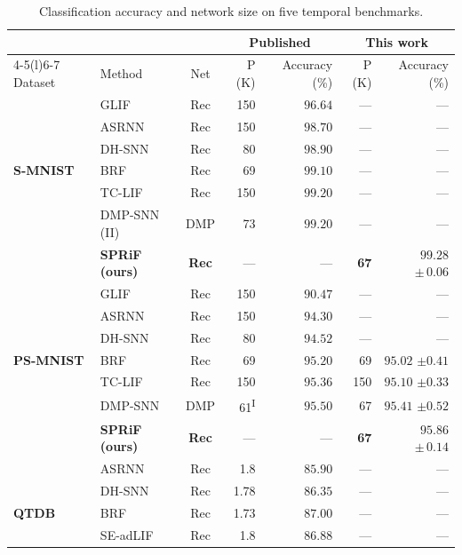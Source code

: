\documentclass[letterpaper,journal]{IEEEtran}
\begin{document}
\begin{table}[!t]
\caption{Classification accuracy and network size on five temporal benchmarks.}
\label{tab:main_results}
\centering\footnotesize
\setlength{\tabcolsep}{3pt}
\renewcommand{\arraystretch}{0.88}
\begin{tabular*}{\textwidth}{@{\extracolsep{\fill}}llcrrrr@{}}
\toprule
& & & \multicolumn{2}{c}{Published} & \multicolumn{2}{c}{This work}\\
\cmidrule(lr){4-5}\cmidrule(l){6-7}
Dataset & Method & Net & P (K) & Accuracy (\%) & P (K) & Accuracy (\%)\\
\midrule
 & GLIF~\cite{glif} & Rec & 150 & $96.64$ & --- & ---\\
 & ASRNN~\cite{asrnn} & Rec & 150 & $98.70$ & --- & ---\\
 & DH-SNN~\cite{dhsnn} & Rec & 80 & $98.90$ & --- & ---\\
\textbf{S-MNIST} & BRF~\cite{brf} & Rec & 69 & $99.10$ & --- & ---\\
 & TC-LIF~\cite{tclif} & Rec & 150 & $99.20$ & --- & ---\\
 & DMP-SNN (II)~\cite{sun2026dmp} & DMP & 73 & $99.20$ & --- & ---\\
 & \textbf{SPRiF (ours)} & \textbf{Rec} & --- & --- & \textbf{67} & $\mathbf{99.28}$ $\boldsymbol{\pm}\,\mathbf{0.06}$\\
\midrule
 & GLIF~\cite{glif} & Rec & 150 & $90.47$ & --- & ---\\
 & ASRNN~\cite{asrnn} & Rec & 150 & $94.30$ & --- & ---\\
 & DH-SNN~\cite{dhsnn} & Rec & 80 & $94.52$ & --- & ---\\
\textbf{PS-MNIST} & BRF~\cite{brf} & Rec & 69 & $95.20$ & 69 & $95.02$ $\pm 0.41$\\
 & TC-LIF~\cite{tclif} & Rec & 150 & $95.36$ & 150 & $95.10$ $\pm 0.33$\\
 & DMP-SNN~\cite{sun2026dmp} & DMP & 61\textsuperscript{I} & $95.50$ & 67 & $95.41$ $\pm 0.52$\\
 & \textbf{SPRiF (ours)} & \textbf{Rec} & --- & --- & \textbf{67} & $\mathbf{95.86}$ $\boldsymbol{\pm}\,\mathbf{0.14}$\\
\midrule
 & ASRNN~\cite{asrnn} & Rec & 1.8 & $85.90$ & --- & ---\\
 & DH-SNN~\cite{dhsnn} & Rec & 1.78 & $86.35$ & --- & ---\\
\textbf{QTDB} & BRF~\cite{brf} & Rec & 1.73 & $87.00$ & --- & ---\\
 & SE-adLIF~\cite{adlif} & Rec & 1.8 & $86.88$ & --- & ---\\

\end{tabular*}
\end{table}
\end{document}
